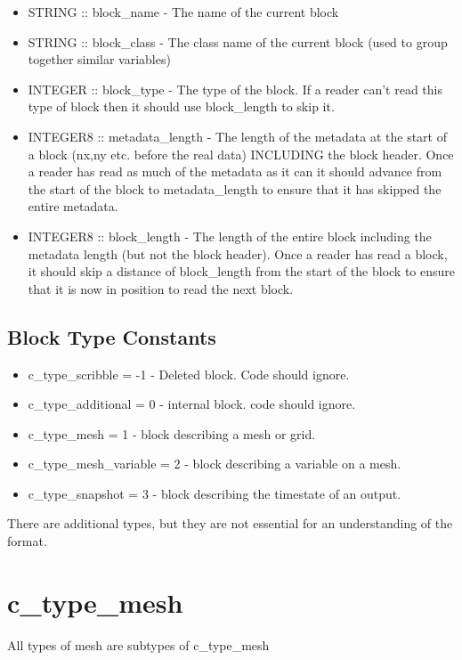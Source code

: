 \documentclass[8pt]{article} \usepackage{url,graphicx,tabularx,array}
\begin{document}
\begin{itemize}
\item STRING :: block\_name - The name of the current block
\item STRING :: block\_class - The class name of the current block (used to
  group together similar variables)
\item INTEGER :: block\_type - The type of the block. If a reader can't read
  this type of block then it should use block\_length to skip it.
\item INTEGER8 :: metadata\_length - The length of the metadata at the start of
  a block (nx,ny etc. before the real data) INCLUDING the block header. Once a
  reader has read as much of the metadata as it can it should advance from the
  start of the block to metadata\_length to ensure that it has skipped the
  entire metadata.
\item INTEGER8 :: block\_length - The length of the entire block including the
  metadata length (but not the block header). Once a reader has read a block,
  it should skip a distance of block\_length from the start of the block to
  ensure that it is now in position to read the next block.
\end{itemize}

\subsection{Block Type Constants}
\begin{itemize}
\item c\_type\_scribble = -1 - Deleted block. Code should ignore.
\item c\_type\_additional = 0 - internal block. code should ignore.
\item c\_type\_mesh = 1 - block describing a mesh or grid.
\item c\_type\_mesh\_variable = 2 - block describing a variable on a mesh.
\item c\_type\_snapshot = 3 - block describing the timestate of an output.
\end{itemize}

There are additional types, but they are not essential for an
understanding of the format.

\section{c\_type\_mesh}

All types of mesh are subtypes of c\_type\_mesh
\end{document}
